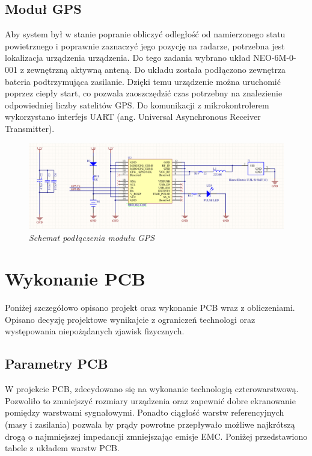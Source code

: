 \documentclass[eng,printmode]{mgr}
\begin{document}
\subsection*{Moduł GPS}
Aby system był w stanie popranie obliczyć odległość od namierzonego statu powietrznego i poprawnie zaznaczyć jego pozycję na radarze, potrzebna jest lokalizacja urządzenia urządzenia. Do tego zadania wybrano układ NEO-6M-0-001 z zewnętrzną aktywną anteną. Do układu została podłączono zewnętrza bateria podtrzymująca zasilanie. Dzięki temu urządzenie można uruchomić poprzez ciepły start, co pozwala zaoszczędzić czas potrzebny na znalezienie odpowiedniej liczby satelitów GPS. Do komunikacji z mikrokontrolerem wykorzystano interfejs UART (ang. Universal Asynchronous Receiver Transmitter).
\begin{figure}[!h]
    \centering
    \includegraphics[width=\textwidth]{schematics/gps.png}
    \caption{\textit{Schemat podłączenia modułu GPS}}
\end{figure}
\newpage

\section{ Wykonanie PCB }
Poniżej szczegółowo opisano projekt oraz wykonanie PCB wraz z obliczeniami. Opisano decyzję projektowe wynikajcie z ograniczeń technologi oraz występowania niepożądanych zjawisk fizycznych.

\subsection*{Parametry PCB} \label{pcbSection}
W projekcie PCB, zdecydowano się na wykonanie technologią czterowarstwową. Pozwoliło to zmniejszyć rozmiary urządzenia oraz zapewnić dobre ekranowanie pomiędzy warstwami sygnałowymi. Ponadto ciągłość warstw referencyjnych (masy i zasilania) pozwala by prądy powrotne przepływało możliwe najkrótszą drogą o najmniejszej impedancji zmniejszając emisje EMC. Poniżej przedstawiono tabele z układem warstw PCB.
\end{document}

